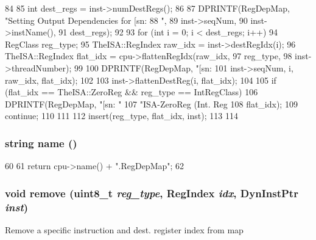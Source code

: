 \begin{DoxyCode}
84 {
85     int dest_regs = inst->numDestRegs();
86 
87     DPRINTF(RegDepMap, "Setting Output Dependencies for [sn:%
88             ", %
89             inst->seqNum,
90             inst->instName(),
91             dest_regs);
92 
93     for (int i = 0; i < dest_regs; i++) {
94         RegClass reg_type;
95         TheISA::RegIndex raw_idx = inst->destRegIdx(i);
96         TheISA::RegIndex flat_idx = cpu->flattenRegIdx(raw_idx,
97                                                        reg_type,
98                                                        inst->threadNumber);
99 
100         DPRINTF(RegDepMap, "[sn:%
101                 inst->seqNum, i, raw_idx, flat_idx);
102 
103         inst->flattenDestReg(i, flat_idx);
104 
105         if (flat_idx == TheISA::ZeroReg && reg_type == IntRegClass) {
106             DPRINTF(RegDepMap, "[sn:%
      "
107                     "ISA-ZeroReg (Int. Reg %
108                     flat_idx);
109             continue;
110         }
111 
112         insert(reg_type, flat_idx, inst);
113     }
114 }
\end{DoxyCode}
\hypertarget{classRegDepMap_aa62b508d2c0e7d9cec12924965276eb5}{
\subsubsection[{name}]{\setlength{\rightskip}{0pt plus 5cm}string name ()}}
\label{classRegDepMap_aa62b508d2c0e7d9cec12924965276eb5}



\begin{DoxyCode}
60 {
61     return cpu->name() + ".RegDepMap";
62 }
\end{DoxyCode}
\hypertarget{classRegDepMap_a87e98fee344305ed226f0e12e43f482b}{
\subsubsection[{remove}]{\setlength{\rightskip}{0pt plus 5cm}void remove (uint8\_\-t {\em reg\_\-type}, \/  {\bf RegIndex} {\em idx}, \/  {\bf DynInstPtr} {\em inst})}}
\label{classRegDepMap_a87e98fee344305ed226f0e12e43f482b}
Remove a specific instruction and dest. register index from map 


